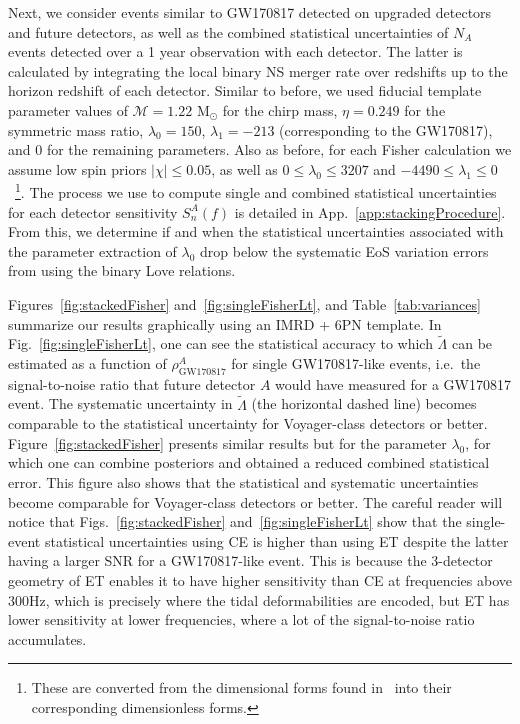 \documentclass[prd,twocolumn,nofootinbib,superscriptaddress,amsmath,amssymb]{revtex4-1}
\begin{document}
Next, we consider events similar to GW170817 detected on upgraded detectors and future detectors, as well as the combined statistical uncertainties of $N_A$ events detected over a 1 year observation with each detector. The latter is calculated by integrating the local binary NS merger rate over redshifts up to the horizon redshift of each detector. 
Similar to before, we used fiducial template parameter values of $\mathcal{M}=1.22\text{ M}_\odot$ for the chirp mass, $\eta=0.249$ for the symmetric mass ratio, $\lambda_0=150$, $\lambda_1=-213$ (corresponding to the GW170817), and $0$ for the remaining parameters.
Also as before, for each Fisher calculation we assume low spin priors $|\chi| \leq 0.05$, as well as $0 \leq \lambda_0 \leq 3207$ and $-4490 \leq \lambda_1 \leq 0$~\cite{delPozzo:TaylorTidal}\footnote{These are converted from the dimensional forms found in~\cite{delPozzo:TaylorTidal} into their corresponding dimensionless forms.}.
The process we use to compute single and combined statistical uncertainties for each detector sensitivity $S_n^A(f)$ is detailed in App.~\ref{app:stackingProcedure}.
From this, we determine if and when the statistical uncertainties associated with the parameter extraction of $\lambda_0$ drop below the systematic EoS variation errors from using the binary Love relations.

Figures~\ref{fig:stackedFisher} and~\ref{fig:singleFisherLt}, and Table~\ref{tab:variances} summarize our results graphically using an IMRD + 6PN template. In Fig.~\ref{fig:singleFisherLt}, one can see the statistical accuracy to which $\tilde{\Lambda}$ can be estimated as a function of $\rho^A_{\text{GW170817}}$ for single GW170817-like events, i.e.~the signal-to-noise ratio that future detector $A$ would have measured for a GW170817 event. The systematic uncertainty in $\tilde{\Lambda}$ (the horizontal dashed line) becomes comparable to the statistical uncertainty for Voyager-class detectors or better. Figure~\ref{fig:stackedFisher} presents similar results but for the parameter $\lambda_{0}$, for which one can combine posteriors and obtained a reduced combined statistical error. This figure also shows that the statistical and systematic uncertainties become comparable for Voyager-class detectors or better. The careful reader will notice that Figs.~\ref{fig:stackedFisher} and~\ref{fig:singleFisherLt} show that the single-event statistical uncertainties using CE is higher than using ET despite the latter having a larger SNR for a GW170817-like event. This is because the 3-detector geometry of ET enables it to have higher sensitivity than CE at frequencies above 300Hz, which is precisely where the tidal deformabilities are encoded, but ET has lower sensitivity at lower frequencies, where a lot of the signal-to-noise ratio accumulates.
\end{document}
